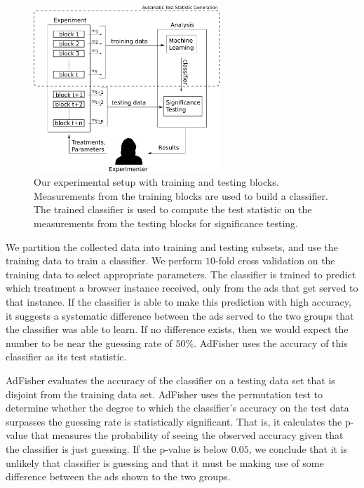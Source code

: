\documentclass[10pt, onecolumn]{report}
\begin{document}
\begin{figure}
\begin{center}
\includegraphics[width = 7cm]{images/methodology2.eps}
\end{center}
\caption{Our experimental setup with training and testing blocks. Measurements from the training blocks are used to build a classifier. The trained classifier is used to compute the test statistic on the measurements from the testing blocks for significance testing.}\label{fig:meth2}
\end{figure}

We partition the collected data into training and testing subsets, 
and use the training data to train a classifier. 
We perform $10$-fold cross validation on the training data
to select appropriate parameters. The classifier is trained to predict which treatment a 
browser instance received, only from the ads that get served to that instance. 
If the classifier is able to make this prediction with high accuracy, 
it suggests a systematic difference between the ads served to the 
two groups that the classifier was able to learn. 
If no difference exists, then we would expect the number to be near 
the guessing rate of $50\%$. AdFisher uses the accuracy of this 
classifier as its test statistic. 

AdFisher evaluates the accuracy of the classifier on a testing data set 
that is disjoint from the training data set.  
AdFisher uses the permutation test to determine 
whether the degree to which the classifier's accuracy on the test data 
surpasses the guessing rate is statistically significant.  That is, it calculates 
the p-value that measures the probability of seeing the observed accuracy 
given that the classifier is just guessing.  If the p-value is below $0.05$, 
we conclude that it is unlikely that classifier is guessing and that it must 
be making use of some difference between the ads shown to the two groups.
\end{document}
